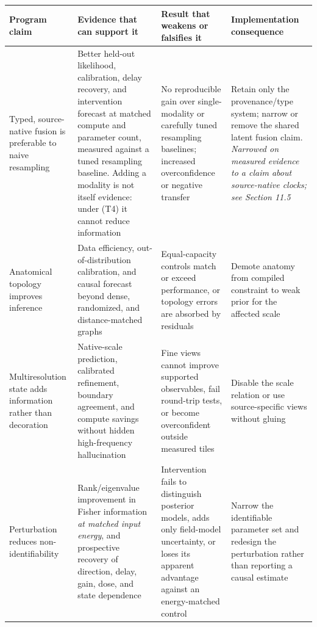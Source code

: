 \begin{table}[t]
\centering
\footnotesize
\setlength{\tabcolsep}{4pt}
\renewcommand{\arraystretch}{1.10}
\begin{tabularx}{\textwidth}{@{}p{}p{}p{}X@{}}
\toprule
\textbf{Program claim} & \textbf{Evidence that can support it} &
\textbf{Result that weakens or falsifies it} & \textbf{Implementation consequence}\\
\midrule
Typed, source-native fusion is preferable to naive resampling &
Better held-out likelihood, calibration, delay recovery, and intervention
forecast at matched compute and parameter count, measured against a tuned
resampling baseline. Adding a modality is not itself evidence: under (T4) it
cannot reduce information &
No reproducible gain over single-modality or carefully tuned resampling
baselines; increased overconfidence or negative transfer &
Retain only the provenance/type system; narrow or remove the shared latent
fusion claim. \emph{Narrowed on measured evidence to a claim about
source-native clocks; see Section 11.5}\\

Anatomical topology improves inference &
Data efficiency, out-of-distribution calibration, and causal forecast beyond
dense, randomized, and distance-matched graphs &
Equal-capacity controls match or exceed performance, or topology errors are
absorbed by residuals &
Demote anatomy from compiled constraint to weak prior for the affected scale\\

Multiresolution state adds information rather than decoration &
Native-scale prediction, calibrated refinement, boundary agreement, and
compute savings without hidden high-frequency hallucination &
Fine views cannot improve supported observables, fail round-trip tests, or
become overconfident outside measured tiles &
Disable the scale relation or use source-specific views without gluing\\

Perturbation reduces non-identifiability &
Rank/eigenvalue improvement in Fisher information \emph{at matched input
energy}, and prospective recovery of direction, delay, gain, dose, and state
dependence &
Intervention fails to distinguish posterior models, adds only field-model
uncertainty, or loses its apparent advantage against an energy-matched control &
Narrow the identifiable parameter set and redesign the perturbation rather
than reporting a causal estimate\\


\end{tabularx}
\end{table}
